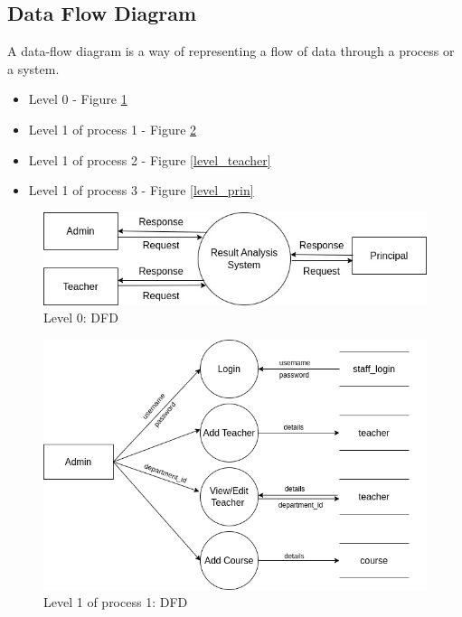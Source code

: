 \documentclass{nascproject}
\begin{document}
\subsection{Data Flow Diagram}
A data-flow diagram is a way of representing a flow of data through a process or a system. 
\begin{itemize}
	\item Level 0 - Figure \ref{level_zero}
	\item Level 1 of process 1 - Figure \ref{level_one}
	\item Level 1 of process 2 - Figure \ref{level_teacher}
	\item Level 1 of process 3 - Figure \ref{level_prin}
\end{itemize}
\begin{figure}
	\centering
	\includegraphics[width=1\linewidth]{level_zero.jpg}
	\caption{Level 0: DFD}
	
	\label{level_zero}
\end{figure}
\begin{figure}
	\centering
	\includegraphics[width=1\linewidth]{level_admin.png}
	\caption{Level 1 of process 1: DFD}
	\label{level_one}
\end{figure}
\end{document}
